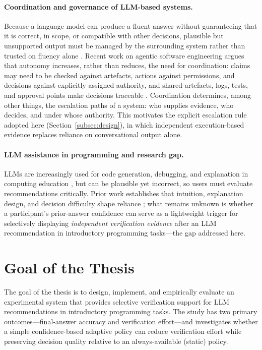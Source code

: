 \documentclass[oneside,final,14pt,a4paper]{extreport}
\begin{document}
\paragraph{Coordination and governance of LLM-based systems.}
Because a language model can produce a fluent answer without guaranteeing that
it is correct, in scope, or compatible with other decisions, plausible but
unsupported output must be managed by the surrounding system rather than
trusted on fluency alone \cite{Ciancarini2027}. Recent work on agentic software
engineering argues that autonomy increases, rather than reduces, the need for
coordination: claims may need to be checked against artefacts, actions against
permissions, and decisions against explicitly assigned authority, and shared
artefacts, logs, tests, and approval points make decisions traceable
\cite{Ciancarini2027}. Coordination determines, among other things, the
escalation paths of a system: who supplies evidence, who decides, and under
whose authority. This motivates the explicit escalation rule adopted here
(Section~\ref{subsec:design}), in which independent execution-based evidence
replaces reliance on conversational
output alone.

\paragraph{LLM assistance in programming and research gap.}
LLMs are increasingly used for code generation, debugging, and explanation in
computing education \cite{Ma2024,Cambaz2024,Denny2024}, but can be plausible
yet incorrect, so users must evaluate recommendations critically. Prior work
establishes that intuition, explanation design, and decision difficulty shape
reliance \cite{Chen2023,Vasconcelos2022,Zhang2024Verify}; what remains
unknown is whether a participant's prior-answer confidence can serve as a
lightweight trigger for selectively displaying \emph{independent verification
evidence} after an LLM recommendation in introductory programming
tasks---the gap addressed here.


\section{Goal of the Thesis}

The goal of the thesis is to design, implement, and empirically evaluate an
experimental system that provides selective verification support for LLM
recommendations in introductory programming tasks. The study has two primary
outcomes---final-answer accuracy and verification effort---and investigates
whether a simple confidence-based adaptive policy can reduce verification
effort while preserving decision quality relative to an always-available
(static) policy.
\end{document}
